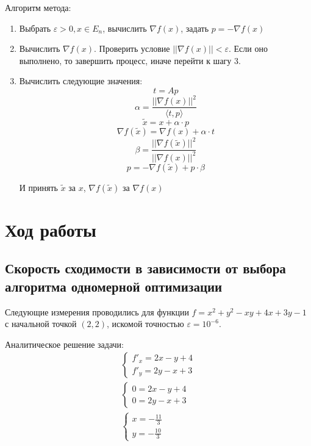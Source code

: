 	Алгоритм метода:
	\begin{enumerate}
		\item Выбрать \(\varepsilon > 0, x \in E_n\), вычислить \(\nabla f(x)\), задать \(p = -\nabla f(x)\)
		\item Вычислить \(\nabla f(x)\). Проверить условие \(||\nabla f(x)|| < \varepsilon\). Если оно выполнено, то завершить процесс, иначе перейти к шагу 3.
		\item Вычислить следующие значения:
		\[t = Ap\]
		\[\alpha = \frac{||\nabla f(x)||^2}{\langle t, p\rangle} \]
		\[\tilde{x} = x + \alpha \cdot p\]
		\[\nabla f(\tilde{x}) = \nabla f(x) + \alpha \cdot t\]
		\[\beta = \frac{||\nabla f(\tilde{x})||^2}{||\nabla f(x)||^2}\]
		\[p = - \nabla f(\tilde{x}) + p \cdot \beta\]
		
		И принять \(\tilde{x}\) за \(x\), \(\nabla f(\tilde{x})\) за \(\nabla f(x)\)
	\end{enumerate}
	
	\section{Ход работы}
	
	\subsection{Скорость сходимости в зависимости от выбора алгоритма одномерной оптимизации}
	
	Следующие измерения проводились для функции \(f = x^2 + y^2 - xy + 4x + 3y - 1\) с начальной точкой \((2, 2)\), искомой точностью \(\varepsilon = 10^{ - 6}\).
	
	Аналитическое решение задачи:
	\begin{align*}
	& \begin{cases}
	f'_x = 2x - y + 4 \\
	f'_y = 2y - x + 3
	\end{cases}  & \\
	& \begin{cases}
	0 = 2x - y + 4 \\
	0 = 2y - x + 3
	\end{cases}   \\
	& \begin{cases} x = - \frac{11}{3} \\ y = - \frac{10}{3} \end{cases}
	\end{align*}
	
